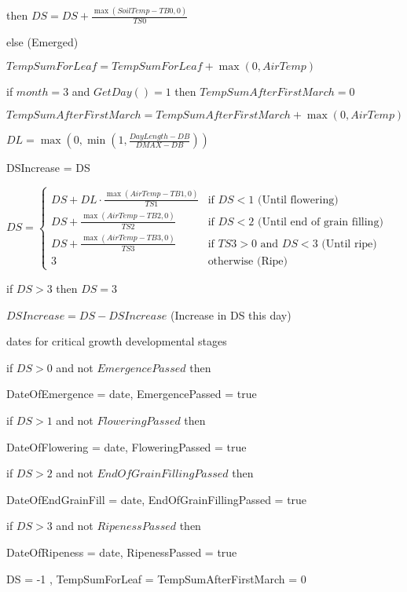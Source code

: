 \documentclass[%
]{scrartcl}
\begin{document}
   \quad then $DS = DS + \tfrac{ \max(SoilTemp-TB0,0)}{TS0}$ \quad 
    
   else  \quad  (Emerged)
  
  \quad 	$TempSumForLeaf = TempSumForLeaf + \max(0,AirTemp)$

\quad 	if $month=3$ and $GetDay()=1$ then $TempSumAfterFirstMarch = 0$
 
 \quad  $ TempSumAfterFirstMarch = TempSumAfterFirstMarch + \max(0,AirTemp)$

 \quad  $DL=\max\left(0,\min\left(1,\tfrac{DayLength-DB}{DMAX-DB}\right)\right)$
   
 \quad   DSIncrease = DS

\quad
$DS = 
\begin{cases}
DS + DL \cdot \tfrac{\max(AirTemp-TB1,0)}{TS1} &  \text{if } DS < 1 \text{ (Until flowering)} \\
DS + \tfrac{\max(AirTemp-TB2,0)}{TS2} &   \text{if } DS < 2  \text{ (Until end of grain filling)} \\
DS + \tfrac{\max(AirTemp-TB3,0)}{TS3} &	\text{if } TS3 > 0 \text{ and } DS < 3 \text{ (Until ripe)} \\
3 & \text{otherwise (Ripe)}	
\end{cases}$

if $DS > 3$ then	$DS = 3$

$DSIncrease = DS-DSIncrease$  (Increase in DS this day)

   dates for critical growth developmental stages
   
   if $DS > 0$ and not $EmergencePassed$ then
   
   \quad	DateOfEmergence = date, EmergencePassed = true

   if $DS > 1$ and not $FloweringPassed$ then
    
   \quad 	DateOfFlowering = date, FloweringPassed = true

   if $DS > 2$ and not $EndOfGrainFillingPassed$ then

  \quad  	DateOfEndGrainFill = date, EndOfGrainFillingPassed = true 
   
   if $DS > 3$ and not $RipenessPassed$ then
    
    \quad 	DateOfRipeness = date, RipenessPassed = true


	DS = -1 , 
   TempSumForLeaf  = 
   TempSumAfterFirstMarch  = 0
\end{document}
